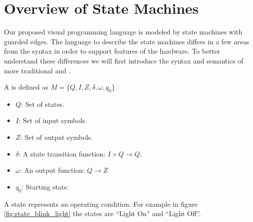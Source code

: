 \section{Overview of State Machines} \label{sec:overviewstatechart}

Our proposed visual programming language is modeled by state machines with guarded edges. The language to describe the state machines differs in a few areas from the   \cite{UML2} syntax in order to support features of the hardware. To better understand these differences we will first introduce the syntax and semantics of more traditional  \cite{booth} and  \cite{UML2}.

\begin{definition}
A  is defined as $M = \lbrace Q, I, Z, \delta, \omega, q_0\rbrace$

\label{def:statecharts}
\begin{itemize}
	\item $Q$: Set of states.
	\item $I$: Set of input symbols.
	\item $Z$: Set of output symbols.
	\item $\delta$: A state transition function: $I \times Q \rightarrow Q$. 
	\item $\omega$: An output function: $Q \rightarrow Z$
	\item $q_0$: Starting state.
\end{itemize}
\end{definition}

A state represents an operating condition. For example in figure \ref{fig:state_blink_light} the states are ``Light On'' and ``Light Off''.

